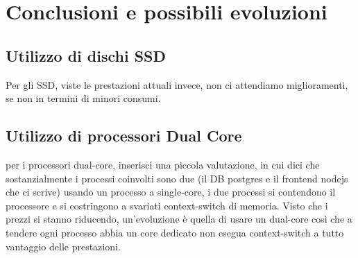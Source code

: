 \chapter{Conclusioni e possibili evoluzioni}
\section{Utilizzo di dischi SSD}
Per gli SSD, viste le prestazioni attuali invece, non ci attendiamo miglioramenti, se non in termini di minori consumi.

\section{Utilizzo di processori Dual Core}
per i processori dual-core, inserisci una piccola valutazione, in cui dici che sostanzialmente i processi coinvolti sono due (il DB postgres e il frontend nodejs che ci scrive)
usando un processo a single-core, i due processi si contendono il processore
e si costringono a svariati context-switch di memoria.
Visto che i prezzi si stanno riducendo, un'evoluzione è quella di usare un dual-core
così che a tendere ogni processo abbia un core dedicato
non esegua context-switch
a tutto vantaggio
delle prestazioni.